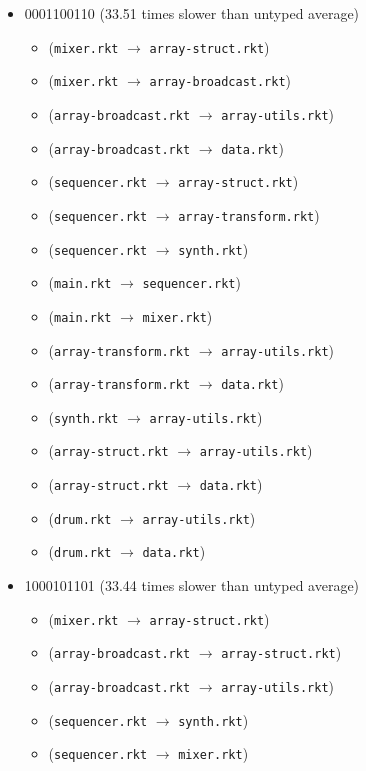 \documentclass{article}
\newcommand{\mono}[1]{\texttt{#1}}
\begin{document}
\begin{itemize}
\item 0001100110 (33.51 times slower than untyped average)
  \begin{itemize}
  \item (\mono{mixer.rkt} $\rightarrow$ \mono{array-struct.rkt})
  \item (\mono{mixer.rkt} $\rightarrow$ \mono{array-broadcast.rkt})
  \item (\mono{array-broadcast.rkt} $\rightarrow$ \mono{array-utils.rkt})
  \item (\mono{array-broadcast.rkt} $\rightarrow$ \mono{data.rkt})
  \item (\mono{sequencer.rkt} $\rightarrow$ \mono{array-struct.rkt})
  \item (\mono{sequencer.rkt} $\rightarrow$ \mono{array-transform.rkt})
  \item (\mono{sequencer.rkt} $\rightarrow$ \mono{synth.rkt})
  \item (\mono{main.rkt} $\rightarrow$ \mono{sequencer.rkt})
  \item (\mono{main.rkt} $\rightarrow$ \mono{mixer.rkt})
  \item (\mono{array-transform.rkt} $\rightarrow$ \mono{array-utils.rkt})
  \item (\mono{array-transform.rkt} $\rightarrow$ \mono{data.rkt})
  \item (\mono{synth.rkt} $\rightarrow$ \mono{array-utils.rkt})
  \item (\mono{array-struct.rkt} $\rightarrow$ \mono{array-utils.rkt})
  \item (\mono{array-struct.rkt} $\rightarrow$ \mono{data.rkt})
  \item (\mono{drum.rkt} $\rightarrow$ \mono{array-utils.rkt})
  \item (\mono{drum.rkt} $\rightarrow$ \mono{data.rkt})
  \end{itemize}
\item 1000101101 (33.44 times slower than untyped average)
  \begin{itemize}
  \item (\mono{mixer.rkt} $\rightarrow$ \mono{array-struct.rkt})
  \item (\mono{array-broadcast.rkt} $\rightarrow$ \mono{array-struct.rkt})
  \item (\mono{array-broadcast.rkt} $\rightarrow$ \mono{array-utils.rkt})
  \item (\mono{sequencer.rkt} $\rightarrow$ \mono{synth.rkt})
  \item (\mono{sequencer.rkt} $\rightarrow$ \mono{mixer.rkt})

\end{itemize}
\end{itemize}
\end{document}
